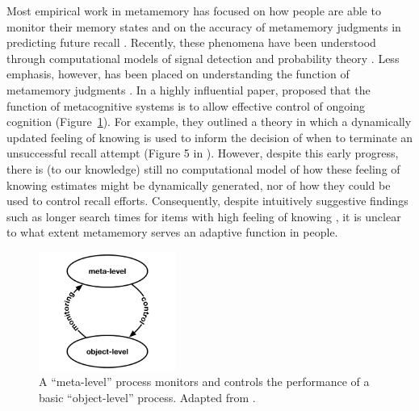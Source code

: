 Most empirical work in metamemory has focused on how people are able to monitor their memory states \citep{reder1992determines,miner1994new,eakin2005illusions} and on the accuracy of metamemory judgments in predicting future recall \citep{hart1965memory,vesonder1985ability,dunlosky1992importance,dunlosky2007metacomprehension}. Recently, these phenomena have been understood through computational models of signal detection \citep{jang2012stochastic} and probability theory \citep{hu2021bayesian}. Less emphasis, however, has been placed on understanding the function of metamemory judgments \citep{schwartz2017metamemory}. In a highly influential paper, \citetnelson{} proposed that the function of metacognitive systems is to allow effective control of ongoing cognition (Figure~\ref{fig:nelson}). For example, they outlined a theory in which a dynamically updated feeling of knowing is used to inform the decision of when to terminate an unsuccessful recall attempt (Figure 5 in \citealpnelson{}). However, despite this early progress, there is (to our knowledge) still no computational model of how these feeling of knowing estimates might be dynamically generated, nor of how they could be used to control recall efforts. Consequently, despite intuitively suggestive findings such as longer search times for items with high feeling of knowing \citep{nelson1984comparison,nhouyvanisvong1998rapid,gruneberg1977methodological,lachman1979metamemory}, it is unclear to what extent metamemory serves an adaptive function in people.

\begin{figure}
  \centering
  \includegraphics[width=0.4\textwidth]{figs/memory/nelson.pdf}
  \caption{ A ``meta-level'' process monitors and controls the performance of a basic ``object-level'' process. Adapted from \citetnelson{}.}
  \label{fig:nelson}
\end{figure}

